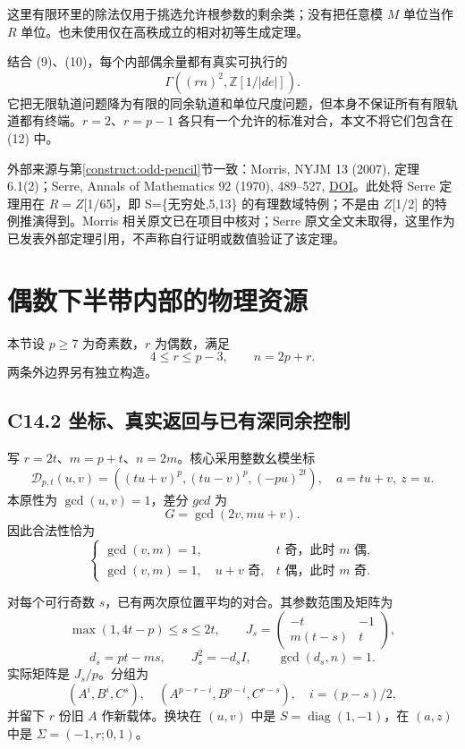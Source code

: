 \documentclass[11pt,a4paper]{article}
\theoremstyle{definition}
\numberwithin{equation}{section}
\begin{document}
{这里有限环里的除法仅用于挑选允许根参数的剩余类；没有把任意模} {\ensuremath{M}} {单位当作} {\ensuremath{R}} {单位。也未使用仅在高秩成立的相对初等生成定理。}

{结合} {(9)、(10)，每个内部偶余量都有真实可执行的} \[
\boxed{\Gamma((rn)^2,\mathbb Z[1/|de|]).}
\tag{C13.12}
\] {它把无限轨道问题降为有限的同余轨道和单位尺度问题，但本身不保证所有有限轨道都有终端。\ensuremath{r=2}、\ensuremath{r=p-1}} {各只有一个允许的标准对合，本文不将它们包含在} {(12)} {中。}

{外部来源与}第\ref{construct:odd-pencil}节{一致：Morris,} {NYJM} {13} {(2007),} {定理} {6.1(2)；Serre,} {Annals} {of} {Mathematics} {92} {(1970),} {489--527,} \href{https://doi.org/10.2307/1970630}{DOI}{。此处将} {Serre} {定理用在} {\ensuremath{R=Z}{[}1/65{]}，即} {S=\{无穷处,5,13\}} {的有理数域特例；不是由} {\ensuremath{Z}{[}1/2{]}} {的特例推演得到。Morris} {相关原文已在项目中核对；Serre} {原文全文未取得，这里作为已发表外部定理引用，不声称自行证明或数值验证了该定理。}


\section{偶数下半带内部的物理资源}\label{construct:even-interior}
{本节设} \(p\ge7\) {为奇素数，}\(r\) {为偶数，满足} \[4\le r\le p-3,\qquad n=2p+r.\tag{C14.1}\] {两条外边界另有独立构造。}

\subsection*{\texorpdfstring{{C14.2} {坐标、真实返回与已有深同余控制}}{C14.2 坐标、真实返回与已有深同余控制}}\label{C14-h92}

{写} \(r=2t\){、}\(m=p+t\){、}\(n=2m\){。核心采用整数幺模坐标} \[
\mathcal D_{p,t}(u,v)=((tu+v)^p,(tu-v)^p,(-pu)^{2t}),
\quad a=tu+v,\ z=u.
\] {本原性为} \(\gcd(u,v)=1\){，差分} {\ensuremath{gcd}} {为} \[
G=\gcd(2v,mu+v).
\] {因此合法性恰为} \[
\begin{cases}
\gcd(v,m)=1,&t\text{ 奇，此时 }m\text{ 偶},\\
\gcd(v,m)=1,\quad u+v\text{ 奇},&t\text{ 偶，此时 }m\text{ 奇}.
\end{cases}\tag{C14.3}
\]

{对每个可行奇数} \(s\){，已有两次原位置平均的对合。其参数范围及矩阵为} \[
\max(1,4t-p)\le s\le2t,\qquad
J_s=\begin{pmatrix}-t&-1\\m(t-s)&t\end{pmatrix},
\] \[
d_s=pt-ms,\qquad J_s^2=-d_sI,\qquad \gcd(d_s,n)=1.
\tag{C14.4}
\] {实际矩阵是} \(J_s/p\){。分组为} \[
(A^i,B^i,C^s),\quad(A^{p-r-i},B^{p-i},C^{r-s}),\quad
i=(p-s)/2,
\] {并留下} \(r\) {份旧} \(A\) {作新载体。换块在} \((u,v)\) {中是} \(S=\operatorname{diag}(1,-1)\){，在} \((a,z)\) {中是} \(\Sigma=(-1,r;0,1)\){。}
\end{document}
